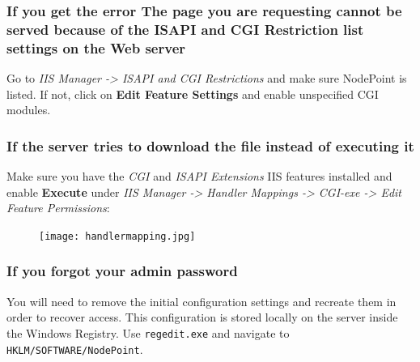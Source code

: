 \documentclass[11pt]{article}
\begin{document}
{\subsubsection{If you get the error The page you are requesting cannot be served because of the ISAPI and CGI Restriction list settings on the Web server}

Go to \textit{IIS Manager -> ISAPI and CGI Restrictions} and make sure NodePoint is listed. If not, click on \textbf{Edit Feature Settings} and enable unspecified CGI modules.

\subsubsection{If the server tries to download the file instead of executing it}

Make sure you have the \textit{CGI} and \textit{ISAPI Extensions} IIS features installed and enable \textbf{Execute} under \textit{IIS Manager -> Handler Mappings -> CGI-exe -> Edit Feature Permissions}:

\begin{figure}[h]
\texttt{[image: handlermapping.jpg]}
\end{figure}

\subsubsection{If you forgot your admin password}

You will need to remove the initial configuration settings and recreate them in order to recover access. This configuration is stored locally on the server inside the Windows Registry. Use \texttt{regedit.exe} and navigate to \texttt{HKLM/SOFTWARE/NodePoint}.
}
\end{document}
